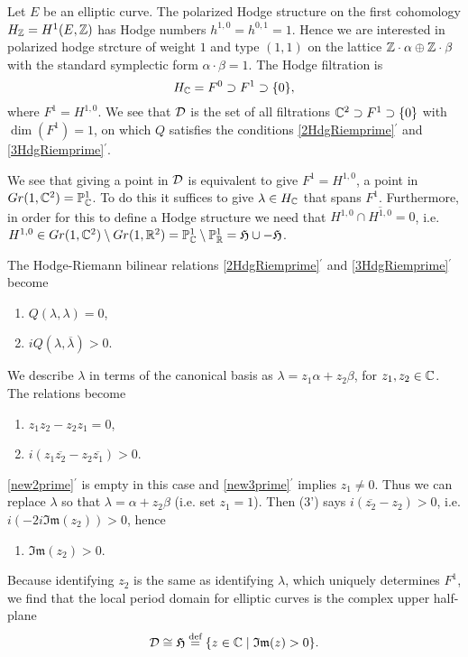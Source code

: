 \documentclass[../main.tex]{subfiles}
\begin{document}
\begin{es} Let $E$ be an elliptic curve. 
The polarized Hodge structure on the first cohomology $H_{\mathbb{Z}} = H^1(E,\mathbb{Z})$ has Hodge numbers $h^{1,0} = h^{0,1} = 1$. Hence we are interested in polarized hodge strcture of weight $1$ and type $(1,1)$ on the lattice $\mathbb{Z} \cdot \alpha \oplus  \mathbb{Z} \cdot \beta$ with the standard symplectic form $\alpha\cdot \beta = 1$. The Hodge filtration is
\[ H_{\mathbb{C}} = F^0 \supset F^1 \supset \{0\},\]
where $F^1 = H^{1,0}$. We see that $\mathcal{D}$ is the set of all filtrations $\mathbb{C}^2 \supset F^1 \supset \{0\}$ with $\dim(F^1) = 1$, on which $Q$ satisfies the conditions \eqref{2HdgRiemprime}$^\prime$ and \eqref{3HdgRiemprime}$^\prime$.

We see that giving a point in  $\mathcal{D}$ is equivalent to give $ F^1=H^{1,0}$, a point in $Gr(1,\mathbb{C}^2) = \mathbb{P}^1_{\mathbb{C}}$. 
To do this it suffices to give $\lambda \in H_{\mathbb{C}}$ that spans $F^1$. 
Furthermore, in order for this to define a Hodge structure we need that $H^{1,0} \cap \overline{H^{1,0}} = {0}$, i.e. $H^{1,0} \in Gr(1,\mathbb{C}^2) \setminus Gr(1,\mathbb{R}^2) =  \mathbb{P}^1_{\mathbb{C}} \setminus  \mathbb{P}^1_{\mathbb{R}} = \mathfrak{H} \cup -\mathfrak{H}$.

The Hodge-Riemann bilinear relations \eqref{2HdgRiemprime}$^\prime$ and \eqref{3HdgRiemprime}$^\prime$ become
\begin{enumerate}[(1')]\addtocounter{enumi}{1}\setlength{\itemindent}{\parindent}
\item $Q(\lambda,\lambda) = 0$,
\item $i Q(\lambda,\overline{\lambda}) > 0$.
\end{enumerate}
We describe $\lambda$ in terms of the canonical basis as $\lambda = z_1\alpha + z_2 \beta$, for $z_1,z_2 \in \mathbb{C}$. The relations become
\begin{enumerate}[(1')]\addtocounter{enumi}{1}\setlength{\itemindent}{\parindent}
\item \label{new2prime} $z_1z_2 - z_2z_1 = 0$,
\item \label{new3prime} $i (z_1\overline{z_2} - z_2\overline{z_1} ) > 0$.
\end{enumerate}
\eqref{new2prime}$^\prime$ is empty in this case and \eqref{new3prime}$^\prime$ implies $z_1 \neq 0$. Thus we can replace $\lambda$ so that $\lambda = \alpha + z_2 \beta$ (i.e. set $z_1 = 1$). Then (3') says $i (\overline{z_2} - z_2 ) > 0$, i.e. $i (-2i \mathfrak{Im} (z_2)) > 0$, hence
\begin{enumerate}[(1')]\addtocounter{enumi}{2}\setlength{\itemindent}{\parindent}
\item $\mathfrak{Im} (z_2) > 0$.
\end{enumerate}
Because identifying $z_2$ is the same as identifying $\lambda$, which uniquely determines $F^1$, we find that the local period domain for elliptic curves is the complex upper half-plane
\[
\mathcal{D} \cong \mathfrak{H} \stackrel{\text{def}}{=} \{z \in \mathbb{C} \mid \mathfrak{Im}(z) > 0\}.
\]
\end{es}
\end{document}
